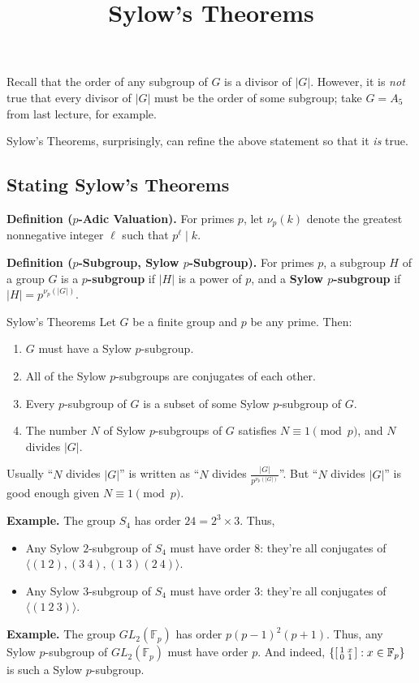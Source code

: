 \title{Sylow's Theorems}



Recall that the order of any subgroup of $G$ is a divisor of $|G|$.  However, it is \emph{not} true that every divisor of $|G|$ must be the order of some subgroup; take $G = A_5$ from last lecture, for example.

Sylow's Theorems, surprisingly, can refine the above statement so that it \emph{is} true.

\subsection{Stating Sylow's Theorems}

\textbf{Definition ($p$-Adic Valuation).} For primes $p$, let $\nu_p(k)$ denote the greatest nonnegative integer $\ell$ such that $p^{\ell} \mid k$.

\textbf{Definition ($p$-Subgroup, Sylow $p$-Subgroup).} For primes $p$, a subgroup $H$ of a group $G$ is a \textbf{$p$-subgroup} if $|H|$ is a power of $p$, and a \textbf{Sylow $p$-subgroup} if $|H| = p^{\nu_p(|G|)}$.

\begin{theorem}{Sylow's Theorems}
    Let $G$ be a finite group and $p$ be any prime.  Then:
    \begin{enumerate}
        \item $G$ must have a Sylow $p$-subgroup.
        \item All of the Sylow $p$-subgroups are conjugates of each other.
        \item Every $p$-subgroup of $G$ is a subset of some Sylow $p$-subgroup of $G$.
        \item The number $N$ of Sylow $p$-subgroups of $G$ satisfies $N \equiv 1 \pmod{p}$, and $N$ divides $|G|$.
    \end{enumerate}
\end{theorem}

\begin{remark}
    Usually ``$N$ divides $|G|$'' is written as ``$N$ divides $\frac{|G|}{p^{\nu_p(|G|)}}$''.  But ``$N$ divides $|G|$'' is good enough given $N \equiv 1 \pmod{p}$.
\end{remark}

\textbf{Example.} The group $S_4$ has order $24 = 2^3 \times 3$.  Thus,
\begin{itemize}
    \item Any Sylow $2$-subgroup of $S_4$ must have order $8$: they're all conjugates of $\langle (1 \ 2), (3 \ 4), (1 \ 3) (2 \ 4) \rangle$.
    \item Any Sylow $3$-subgroup of $S_4$ must have order $3$: they're all conjugates of $\langle (1 \ 2 \ 3) \rangle$.
\end{itemize}
\textbf{Example.} The group $GL_2(\mathbb{F}_p)$ has order $p(p - 1)^2(p + 1)$.  Thus, any Sylow $p$-subgroup of $GL_2(\mathbb{F}_p)$ must have order $p$.  And indeed, $\left \{ \begin{bsmallmatrix} 1 & x \\ 0 & 1 \end{bsmallmatrix} : x \in \mathbb{F}_p \right \}$ is such a Sylow $p$-subgroup.

